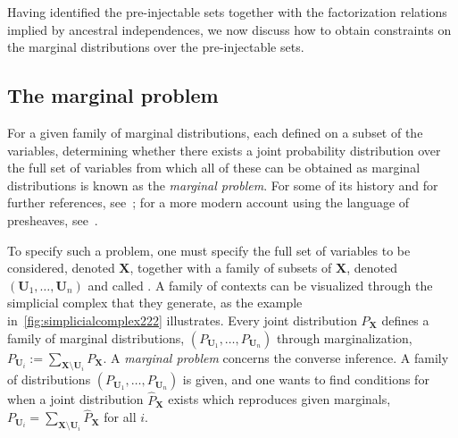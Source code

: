 {Having identified the pre-injectable sets together with the factorization relations implied by ancestral independences, we now discuss how to obtain constraints on the marginal distributions over the pre-injectable sets.

\subsection{The marginal problem}\label{step:marginalsproblem}

For a given family of marginal distributions, each defined on a subset of the variables, determining whether there exists a joint probability distribution over the full set of variables from which all of these can be obtained as marginal distributions is known as the {\em marginal problem}.
For some of its history and for further references, see~\cite{fritz2013marginal}; for a more modern account using the language of presheaves, see~\cite{abramsky_contextuality_2011}.

To specify such a problem, one must specify the full set of variables to be considered, denoted $\bm{X}$, together with a family of subsets of $\bm{X}$, denoted $(\bm{U}_1,\ldots,\bm{U}_n)$ and called .
A family of contexts can be visualized through 
the simplicial complex that they generate, as the example in~\cref{fig:simplicialcomplex222} illustrates. Every joint distribution $P_{\bm{X}}$ %
defines a family of marginal distributions, $(P_{\bm{U}_1},\ldots,P_{\bm{U}_n})$ through marginalization,  $P_{\bm{U}_i} := \sum_{\bm{X} \setminus \bm{U}_i} P_{\bm{X}}$. A \emph{marginal problem} concerns the converse inference.  A family of distributions $(P_{\bm{U}_1},\ldots,P_{\bm{U}_n})$ is given, and one wants to find conditions for when a joint distribution $\hat{P}_{\bm{X}}$ exists which reproduces given marginals, $P_{\bm{U}_i} = \sum_{\bm{X}\setminus\bm{U}_i} \hat{P}_{\bm{X}}$ for all $i$.

}
